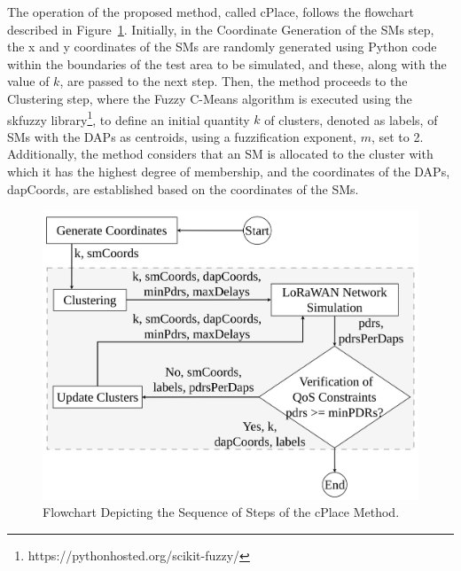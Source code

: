\documentclass[a4paper,fleqn]{cas-dc}
\begin{document}
The operation of the proposed method, called cPlace, follows the flowchart described in Figure~\ref{fig:flowchart}. Initially, in the Coordinate Generation of the \gls{SMs} step, the x and y coordinates of the \gls{SMs} are randomly generated using Python code~\cite{python2022} within the boundaries of the test area to be simulated, and these, along with the value of \( k \), are passed to the next step. Then, the method proceeds to the Clustering step, where the Fuzzy C-Means algorithm is executed using the skfuzzy library\footnote{https://pythonhosted.org/scikit-fuzzy/}, to define an initial quantity \( k \) of clusters, denoted as labels, of SMs with the \gls{DAPs} as centroids, using a fuzzification exponent, $m$, set to 2. Additionally, the method considers that an SM is allocated to the cluster with which it has the highest degree of membership, and the coordinates of the \gls{DAPs}, dapCoords, are established based on the coordinates of the \gls{SMs}.

\begin{figure}[ht]
    \centering
    \includegraphics[width=1\linewidth]{imgs/flowchart.png}
    \caption{Flowchart Depicting the Sequence of Steps of the cPlace Method.}
    \label{fig:flowchart}
\end{figure}
\end{document}
